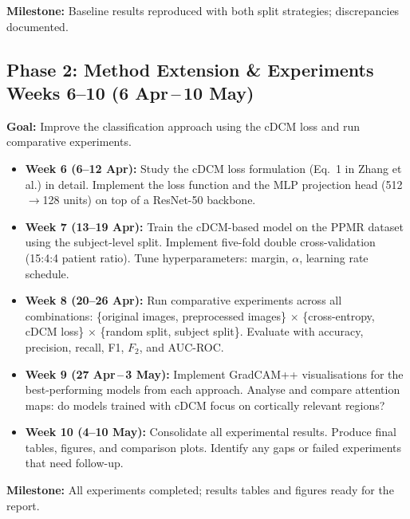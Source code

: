 \documentclass[a4paper,11pt]{article}
\begin{document}
\noindent\textbf{Milestone:} Baseline results reproduced with both split strategies; discrepancies documented.

\subsection*{\textcolor{phase2}{Phase 2: Method Extension \& Experiments \hfill Weeks 6--10 {\normalfont(6 Apr\,--\,10 May)}}}

\textbf{Goal:} Improve the classification approach using the cDCM loss and run comparative experiments.

\begin{itemize}[leftmargin=*]
    \item \textbf{Week 6 (6--12 Apr):}
    Study the cDCM loss formulation (Eq.~1 in Zhang et al.) in detail.
    Implement the loss function and the MLP projection head (512$\to$128 units) on top of a ResNet-50 backbone.

    \item \textbf{Week 7 (13--19 Apr):}
    Train the cDCM-based model on the PPMR dataset using the subject-level split.
    Implement five-fold double cross-validation (15:4:4 patient ratio).
    Tune hyperparameters: margin, $\alpha$, learning rate schedule.

    \item \textbf{Week 8 (20--26 Apr):}
    Run comparative experiments across all combinations:
    \{original images, preprocessed images\} $\times$ \{cross-entropy, cDCM loss\} $\times$ \{random split, subject split\}.
    Evaluate with accuracy, precision, recall, F1, $F_2$, and AUC-ROC.

    \item \textbf{Week 9 (27 Apr\,--\,3 May):}
    Implement GradCAM++ visualisations for the best-performing models from each approach.
    Analyse and compare attention maps: do models trained with cDCM focus on cortically relevant regions?

    \item \textbf{Week 10 (4--10 May):}
    Consolidate all experimental results.
    Produce final tables, figures, and comparison plots.
    Identify any gaps or failed experiments that need follow-up.
\end{itemize}

\noindent\textbf{Milestone:} All experiments completed; results tables and figures ready for the report.
\end{document}
